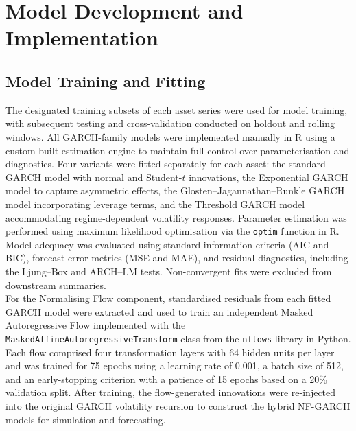 \documentclass[oneside,12pt]{CUEDthesisPSnPDF}
\begin{document}

\section{Model Development and Implementation} 

\subsection{Model Training and Fitting}

\noindent
The designated training subsets of each asset series were used for model training, with subsequent testing and cross-validation conducted on holdout and rolling windows. All GARCH-family models were implemented manually in \textsf{R} using a custom-built estimation engine to maintain full control over parameterisation and diagnostics. Four variants were fitted separately for each asset: the standard GARCH model with normal and Student-$t$ innovations, the Exponential GARCH model to capture asymmetric effects, the Glosten–Jagannathan–Runkle GARCH model incorporating leverage terms, and the Threshold GARCH model accommodating regime-dependent volatility responses. Parameter estimation was performed using maximum likelihood optimisation via the \texttt{optim} function in \textsf{R}. Model adequacy was evaluated using standard information criteria (AIC and BIC), forecast error metrics (MSE and MAE), and residual diagnostics, including the Ljung–Box and ARCH–LM tests. Non-convergent fits were excluded from downstream summaries.\\

\medskip
\noindent
For the Normalising Flow component, standardised residuals from each fitted GARCH model were extracted and used to train an independent Masked Autoregressive Flow implemented with the \texttt{MaskedAffineAutoregressiveTransform} class from the \texttt{nflows} library in \textsf{Python}. Each flow comprised four transformation layers with 64 hidden units per layer and was trained for 75 epochs using a learning rate of 0.001, a batch size of 512, and an early-stopping criterion with a patience of 15 epochs based on a 20\% validation split. After training, the flow-generated innovations were re-injected into the original GARCH volatility recursion to construct the hybrid NF-GARCH models for simulation and forecasting.\\
\end{document}

